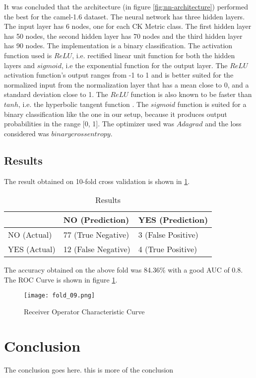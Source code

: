 \documentclass[10pt, conference, compsocconf]{IEEEtran}
\begin{document}
It was concluded that the architecture (in figure \ref{fig:nn-architecture}) performed the best for the camel-1.6 dataset. The neural network has three hidden layers. The input layer has 6 nodes, one for each CK Metric class. The first hidden layer has 50 nodes, the second hidden layer has 70 nodes and the third hidden layer has 90 nodes. The implementation is a binary classification. The activation function used is $ReLU$, i.e. rectified linear unit function for both the hidden layers and $sigmoid$, i.e the exponential function for the output layer. The $ReLU$ activation function's output ranges from -1 to 1 and is better suited for the normalized input from the normalization layer that has a mean close to 0, and a standard deviation close to 1. The $ReLU$ function is also known to be faster than $tanh$, i.e. the hyperbolic tangent function \cite{relufaster}. The $sigmoid$ function is suited for a binary classification like the one in our setup, because it produces output probabilities in the range [0, 1]. The optimizer used was $Adagrad$ and the loss considered was $binary crossentropy$.

\subsection{Results}
The result obtained on 10-fold cross validation is shown in \ref{tab:results}.

\begin{table}[]
  \centering
  \begin{tabular}{l|l|l|}
    \cline{2-3}
    & NO (Prediction)     & YES (Prediction) \\ \hline
    \multicolumn{1}{|l|}{NO (Actual)}  & 77 (True Negative)  & 3 (False Positive)  \\ \hline
    \multicolumn{1}{|l|}{YES (Actual)} & 12 (False Negative) & 4 (True Positive)  \\ \hline
  \end{tabular}
  \caption{Results}
  \label{tab:results}
\end{table}

The accuracy obtained on the above fold was 84.36\% with a good AUC of 0.8. The ROC Curve is shown in figure \ref{fig:roc}.

\begin{figure}[h]
\centering
\texttt{[image: fold\_09.png]}
\caption{Receiver Operator Characteristic Curve}
\label{fig:roc}
\end{figure}

\section{Conclusion}
The conclusion goes here. this is more of the conclusion
\end{document}
